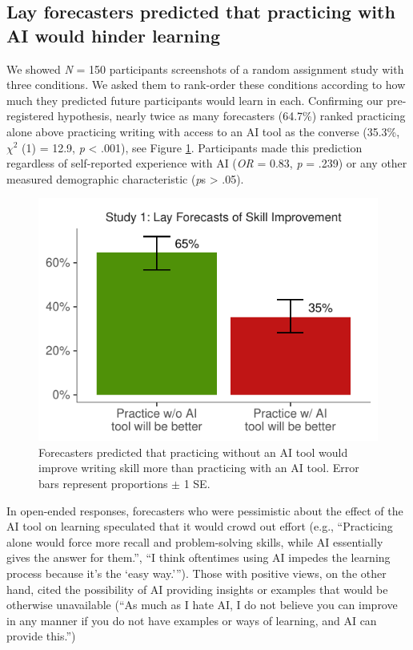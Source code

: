 \documentclass[11pt]{report}
\begin{document}
\begin{mainf}
\subsection{Lay forecasters predicted that practicing with AI would hinder learning}

We showed \textit{N} = 150 participants screenshots of a random assignment study with three conditions.
  We asked them to rank-order these conditions according to how much they predicted future participants would learn in each. 
  Confirming our pre-registered hypothesis, nearly twice as many forecasters (64.7\%) ranked practicing alone above practicing writing with access to an AI tool as the converse (35.3\%, $\chi^2$ (1) = 12.9, \textit{p} < .001), see Figure \ref{fig:s1}. 
  Participants made this prediction regardless of self-reported experience with AI (\textit{OR} = 0.83, \textit{p} = .239) or any other measured demographic characteristic (\textit{p}s > .05).
  
\begin{figure}[]
    \centering
    \includegraphics[width=1\linewidth]{ranking.pdf}
    \caption{Forecasters predicted that practicing without an AI tool would improve writing skill more than practicing with an AI tool. Error bars represent proportions $\pm$ 1 SE.}
    \label{fig:s1}
\end{figure}

In open-ended responses, forecasters who were pessimistic about the effect of the AI tool on learning speculated that it would crowd out effort (e.g., ``Practicing alone would force more recall and problem-solving skills, while AI essentially gives the answer for them.'', ``I think oftentimes using AI impedes the learning process because it's the `easy way.'''). Those with positive views, on the other hand, cited the possibility of AI providing insights or examples that would be otherwise unavailable (``As much as I hate AI, I do not believe you can improve in any manner if you do not have examples or ways of learning, and AI can provide this.'')




\end{mainf}
\end{document}
